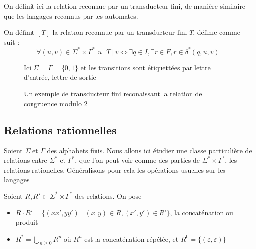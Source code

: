\documentclass{scrartcl}
\begin{document}
\begin{flushleft}
On définit ici la relation reconnue par un transducteur fini, de manière similaire que les
langages reconnus par les automates.
\begin{define}
    On définit $[T]$ la relation reconnue par un transducteur fini $T$, définie comme suit :
    \[ \forall (u, v) \in \Sigma^* \times \Gamma^*, u[T]v \Leftrightarrow \exists q \in I, \exists r \in F,
    r \in \delta^*(q, u, v) \]
\end{define}

\begin{figure}[h]
    \caption{Un exemple de transducteur fini reconaissant la relation de congruence modulo 2}
    \begin{center}
    Ici $\Sigma = \Gamma = \{0, 1\}$ et les transitions sont étiquettées par lettre d'entrée, lettre de sortie\\
    \vspace*{0.5cm}
    \end{center}
\end{figure}


\subsection{Relations rationnelles}

Soient $\Sigma$ et $\Gamma$ des alphabets finis. Nous allons ici étudier une classe particulière
de relations entre $\Sigma^*$ et $\Gamma^*$, que l'on peut voir comme des parties de $\Sigma^* \times \Gamma^*$,
les relations rationelles. Généralisons pour cela les opérations usuelles sur les langages 

\begin{define}
    Soient $R, R' \subset \Sigma^* \times \Gamma^*$ des relations. On pose
    \begin{itemize}
        \item $R \cdot R' = \{ (xx', yy') \mid (x, y) \in R, (x', y') \in R' \}$, la concaténation ou produit
        \item $\displaystyle R^* = \bigcup_{n \geq 0} R^n$ où $R^n$ est la concaténation répétée, et $R^0 =
        \{ (\varepsilon, \varepsilon) \}$
    \end{itemize}
\end{define}


\end{flushleft}
\end{document}
